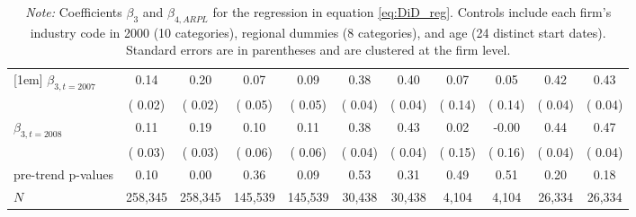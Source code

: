 \begin{table}
{\begin{tabular}{lcccc | cccccc}
[1em]
$\beta_{3, t= 2007} $&  0.14 &  0.20 &  0.07 &  0.09 &  0.38 &  0.40 &  0.07 &  0.05 &  0.42 &  0.43 \\
& ( 0.02) & ( 0.02) & ( 0.05) & ( 0.05) & ( 0.04) & ( 0.04) & ( 0.14) & ( 0.14) & ( 0.04) & ( 0.04) \\
[1em]
$\beta_{3, t= 2008} $&  0.11 &  0.19 &  0.10 &  0.11 &  0.38 &  0.43 &  0.02 & -0.00 &  0.44 &  0.47 \\
& ( 0.03) & ( 0.03) & ( 0.06) & ( 0.06) & ( 0.04) & ( 0.04) & ( 0.15) & ( 0.16) & ( 0.04) & ( 0.04) \\
\hline
pre-trend p-values &  0.10 &  0.00 &  0.36 &  0.09 &  0.53 &  0.31 &  0.49 &  0.51 &  0.20 &  0.18 \\
\(N\) &         258,345 &         258,345 &         145,539 &         145,539 &          30,438 &          30,438 &           4,104 &           4,104 &          26,334 &          26,334 \\
\hline\hline
\end{tabular}
}
\parbox{0.75\textwidth}{\caption*{\scriptsize \textit{Note:} Coefficients $\beta_3$ and $\beta_{4,ARPL}$ for the regression in equation \ref{eq:DiD_reg}. Controls include each firm's industry code in 2000 (10 categories), regional dummies (8 categories), and age (24 distinct start dates). Standard errors are in parentheses and are clustered at the firm level.  } }
\end{table}
